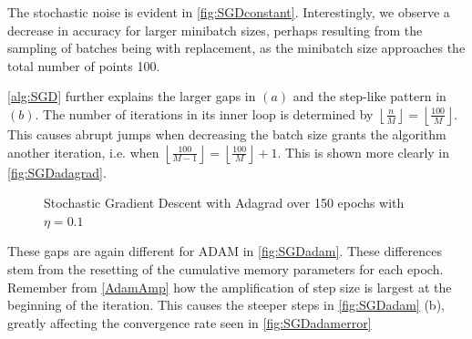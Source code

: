 \documentclass{article}
\theoremstyle{definition}
\begin{document}
The stochastic noise is evident in \autoref{fig:SGDconstant}. Interestingly, we observe a decrease in accuracy for larger minibatch sizes, perhaps resulting from the sampling of batches being with replacement, as the minibatch size approaches the total number of points 100. %

\autoref{alg:SGD} further explains the larger gaps in $(a)$ and the step-like pattern in $(b)$. The number of iterations in its inner loop is determined by $ \left\lfloor\frac{n}{M}\right\rfloor = \left\lfloor\frac{100}{M}\right\rfloor$. This causes abrupt jumps when decreasing the batch size grants the algorithm another iteration, i.e. when $\left\lfloor \frac{100}{M - 1} \right\rfloor = \left\lfloor \frac{100}{M} \right\rfloor + 1$. This is shown more clearly in \autoref{fig:SGDadagrad}.

\begin{figure}[H]%
    \centering
    \qquad
    \caption{Stochastic Gradient Descent with Adagrad over 150 epochs with $\eta = 0.1$}%
    \label{fig:SGDadagrad}%
\end{figure}

These gaps are again different for ADAM in \autoref{fig:SGDadam}.
These differences stem from the resetting of the cumulative memory parameters for each 
epoch. Remember from
\autoref{AdamAmp} how the amplification of step size is largest at the beginning of the iteration. This causes the steeper steps in \autoref{fig:SGDadam} (b), greatly affecting the convergence rate seen in \autoref{fig:SGDadamerror}
\end{document}
